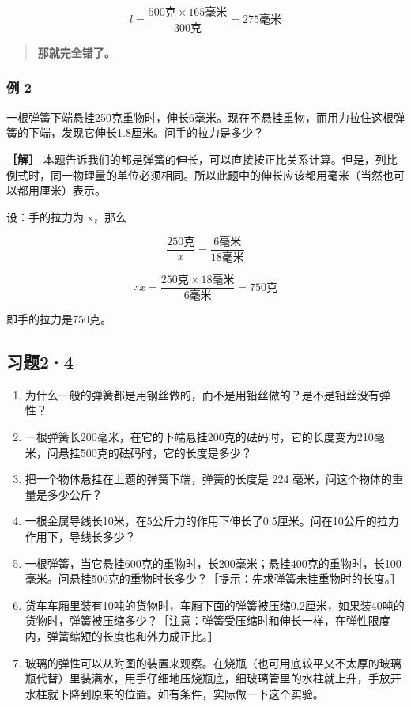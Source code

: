 \[
l = \frac {500 \text{克} \times 165 \text{毫米}}{300 \text{克}} = 275 \text{毫米}
\]

\begin{quote}
\textbf{那就完全错了。}
\end{quote}

\subsubsection{例 2}\label{ux4f8b-2-1}

一根弹簧下端悬挂250克重物时，伸长6毫米。现在不悬挂重物，而用力拉住这根弹簧的下端，发现它伸长1.8厘米。问手的拉力是多少？

\textbf{［解］}
本题告诉我们的都是弹簧的伸长，可以直接按正比关系计算。但是，列比例式时，同一物理量的单位必须相同。所以此题中的伸长应该都用毫米（当然也可以都用厘米）表示。

设：手的拉力为 x，那么

\[
\frac {250 \text{克}}{x} = \frac {6 \text{毫米}}{18 \text{毫米}}
\]

\[
\therefore x = \frac {250 \text{克} \times 18 \text{毫米}}{6 \text{毫米}} = 750 \text{克}
\]

即手的拉力是750克。

\subsection{习题2·4}\label{ux4e60ux989824}

\begin{enumerate}
\def\labelenumi{\arabic{enumi}.}
\item
  为什么一般的弹簧都是用钢丝做的，而不是用铅丝做的？是不是铅丝没有弹性？
\item
  一根弹簧长200毫米，在它的下端悬挂200克的砝码时，它的长度变为210毫米，问悬挂500克的砝码时，它的长度是多少？
\item
  把一个物体悬挂在上题的弹簧下端，弹簧的长度是 224
  毫米，问这个物体的重量是多少公斤？
\item
  一根金属导线长10米，在5公斤力的作用下伸长了0.5厘米。问在10公斤的拉力作用下，导线长多少？
\item
  一根弹簧，当它悬挂600克的重物时，长200毫米；悬挂400克的重物时，长100毫米。问悬挂500克的重物时长多少？［提示：先求弹簧未挂重物时的长度。］
\item
  货车车厢里装有10吨的货物时，车厢下面的弹簧被压缩0.2厘米，如果装40吨的货物时，弹簧被压缩多少？［注意：弹簧受压缩时和伸长一样，在弹性限度内，弹簧缩短的长度也和外力成正比。］
\item
  玻璃的弹性可以从附图的装置来观察。在烧瓶（也可用底较平又不太厚的玻璃瓶代替）里装满水，用手仔细地压烧瓶底，细玻璃管里的水柱就上升，手放开水柱就下降到原来的位置。如有条件，实际做一下这个实验。
\end{enumerate}

